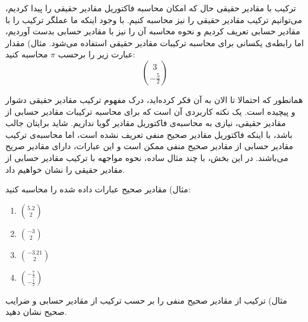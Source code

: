 \begin{extra}{
    ترکیب با مقادیر حقیقی
}
\p
حال که امکان محاسبه فاکتوریل مقادیر حقیقی را پیدا کردیم، می‌توانیم ترکیب مقادیر
حقیقی را نیز محاسبه کنیم. با وجود اینکه ما عملگر ترکیب
را با مقادیر حسابی تعریف کردیم و نحوه محاسبه آن را نیز با مقادیر حسابی بدست آوردیم،
اما رابطه‌ی یکسانی برای محاسبه ترکیبات مقادیر حقیقی استفاده می‌شود.
\p
مثال)
مقدار عبارت زیر را برحسب $\pi$ محاسبه کنید:
$$3 \choose -\frac{5}{2}$$

\p
همانطور که احتمالا تا الان به آن فکر کرده‌اید، درک مفهوم ترکیب مقادیر حقیقی دشوار و پیچیده است.
\p
یک نکته کاربردی آن است که برای محاسبه ترکیبات مقادیر حسابی از مقادیر حقیقی، نیازی به
محاسبه‌ی فاکتوریل مقادیر گویا نداریم.
شاید برایتان جالب باشد، با اینکه فاکتوریل مقادیر صحیح منفی تعریف نشده است، اما محاسبه‌ی
ترکیب مقادیر حسابی از مقادیر صحیح منفی ممکن است و این عبارات، دارای مقادیر صریح می‌باشند.
در این بخش، با چند مثال ساده، نحوه مواجهه با ترکیب مقادیر حسابی از مقادیر حقیقی را نشان خواهیم داد.

\p
مثال)
مقادیر صحیح عبارات داده شده را محاسبه کنید:

    \begin{enumerate}
        \item 
        $5.2 \choose 2$


        \item 
        $-3 \choose 2$


        \item 
        $-3.21 \choose 2$


        \item 
        $-\frac{7}{2} \choose -\frac{1}{2}$

    \end{enumerate}

\p
مثال)
ترکیب از مقادیر صحیح منفی را بر حسب ترکیب از مقادیر حسابی و ضرایب صحیح نشان دهید.
    

\end{extra}
